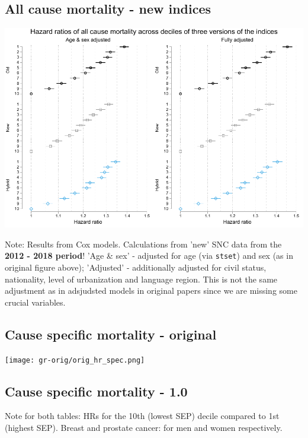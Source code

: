 \documentclass[a4paper, notitlepage, fleqn]{article} %
\begin{document}
\subsection{All cause mortality - new indices}
\begin{center}
\includegraphics[width=\textwidth]{gr/sep3.pdf}
\end{center}

Note: 	Results from Cox models. Calculations from 'new' SNC data from the \textbf{2012 - 2018 period}!  
		'Age \& sex' - adjusted for age (via \texttt{stset}) and sex (as in original figure above);  
		'Adjusted' - additionally adjusted for civil status, nationality, level of urbanization and language region.  
		This is not the same adjustment as in adsjudsted models in original papers since we are missing some crucial variables. 
\newpage
\subsection{Cause specific mortality - original}

\begin{center}
\texttt{[image: gr-orig/orig\_hr\_spec.png]} 
\end{center}

\newpage
\subsection{Cause specific mortality - 1.0}
\begin{stlog}\end{stlog}
Note for both tables: HRs for the 10th (lowest SEP) decile compared to 1st (highest SEP). 
Breast and prostate cancer: for men and women respectively. 
\end{document}
